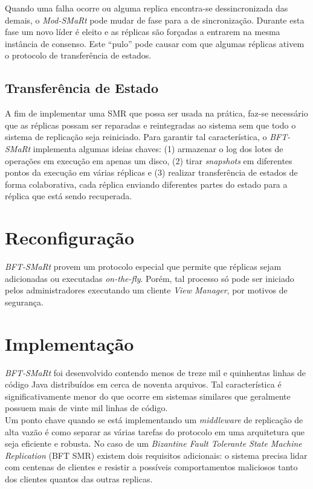 		Quando uma falha ocorre ou alguma replica encontra-se dessincronizada das demais, o \textit{Mod-SMaRt} pode mudar de fase para a de sincronização. Durante esta fase um novo líder é eleito e as réplicas são forçadas a entrarem na mesma instância de consenso. Este “pulo” pode causar com que algumas réplicas ativem o protocolo de transferência de estados.\\
		
		\subsection{Transferência de Estado}
		A fim de implementar uma SMR que possa ser usada na prática, faz-se necessário que as réplicas possam ser reparadas e reintegradas ao sistema sem que todo o sistema de replicação seja reiniciado. Para garantir tal característica, o \textit{BFT-SMaRt} implementa algumas ideias chaves: (1) armazenar o log dos lotes de operações em execução em apenas um disco, (2) tirar \textit{snapshots} em diferentes pontos da execução em várias réplicas e (3) realizar transferência de estados  de forma colaborativa, cada réplica enviando diferentes partes do estado para a réplica que está sendo recuperada.\\
	
	\section{Reconfiguração}
	\textit{BFT-SMaRt} provem um protocolo especial que permite que réplicas sejam adicionadas ou executadas \textit{on-the-fly}. Porém, tal processo só pode ser iniciado pelos administradores executando um cliente \textit{View Manager}, por motivos de segurança.\\
	
	\section{Implementação}
	\textit{BFT-SMaRt} foi desenvolvido contendo menos de treze mil e quinhentas linhas de código Java distribuídos em cerca de noventa arquivos. Tal característica é significativamente menor do que ocorre em sistemas similares que geralmente possuem mais de vinte mil linhas de código. \\
	
	Um ponto chave quando se está implementando um \textit{middleware} de replicação de alta vazão é como separar as várias tarefas do protocolo em uma arquitetura que seja eficiente e robusta. No caso de um \textit{Bizantine Fault Tolerante State Machine Replication} (BFT SMR) existem dois requisitos adicionais: o sistema precisa lidar com centenas de clientes e resistir a possíveis comportamentos maliciosos tanto dos clientes quantos das outras replicas.\\
	
